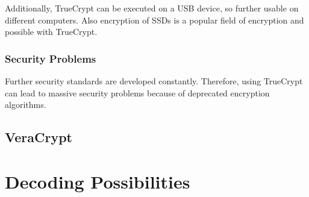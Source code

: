 Additionally, TrueCrypt can be executed on a USB device, so further usable on different computers. Also encryption of SSDs is a popular field of encryption and possible with TrueCrypt. 


\subsubsection{Security Problems}
Further security standards are developed constantly. Therefore, using TrueCrypt can lead to massive security problems because of deprecated encryption algorithms. 








\subsection{VeraCrypt}
\label{sec:vera}

\section{Decoding Possibilities}
